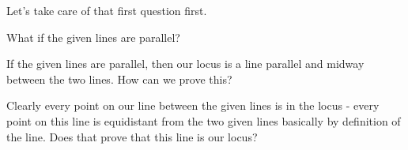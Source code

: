 Let's take care of that first question first.

What if the given lines are parallel?





If the given lines are parallel, then our locus is a line parallel and midway between the two lines. How can we prove this?



Clearly every point on our line between the given lines is in the locus - every point on this line is equidistant from the two given lines basically by definition of the line. Does that prove that this line is our locus?







